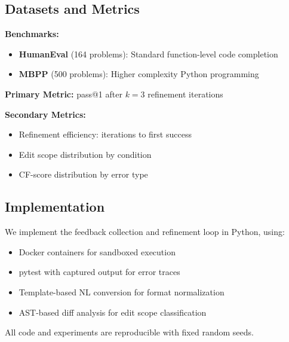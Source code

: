 \subsection{Datasets and Metrics}

\textbf{Benchmarks:}
\begin{itemize}
\item \textbf{HumanEval} (164 problems): Standard function-level code completion~\cite{chen2021humaneval}
\item \textbf{MBPP} (500 problems): Higher complexity Python programming~\cite{austin2021mbpp}
\end{itemize}

\textbf{Primary Metric:} pass@1 after $k=3$ refinement iterations

\textbf{Secondary Metrics:}
\begin{itemize}
\item Refinement efficiency: iterations to first success
\item Edit scope distribution by condition
\item CF-score distribution by error type
\end{itemize}

\subsection{Implementation}

We implement the feedback collection and refinement loop in Python, using:
\begin{itemize}
\item Docker containers for sandboxed execution
\item pytest with captured output for error traces
\item Template-based NL conversion for format normalization
\item AST-based diff analysis for edit scope classification
\end{itemize}

All code and experiments are reproducible with fixed random seeds.
